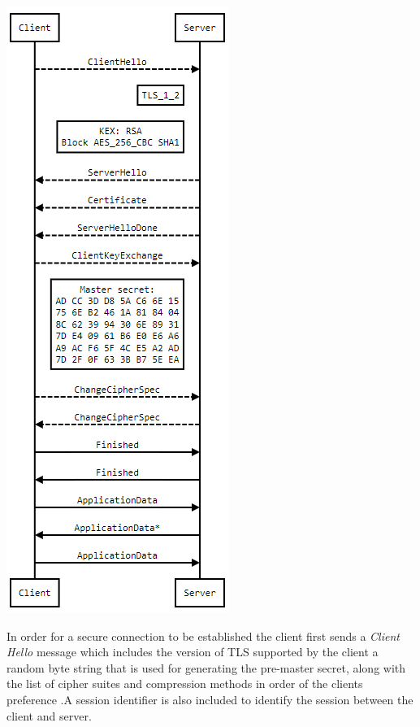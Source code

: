 \documentclass[a4wide,leqno,12pt]{report}
\begin{document}
 \begin{center}
\includegraphics[scale=.5]{images/tls_demo.png}
\end{center}
In order for a secure connection to be established the client first sends a \textit{Client Hello} message which includes the version of TLS supported by the client a random byte string that is used for generating the pre-master secret,  along with the list of cipher suites and compression methods in order of the clients preference \cite{tlsDemoServer}.A session identifier is also included to identify the session between the client and server\cite{turner2014transport}.
\end{document}
